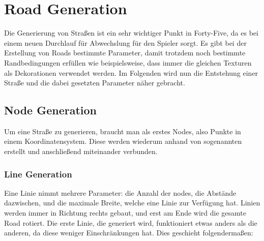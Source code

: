 
\section{Road Generation}\label{sec:road-generation}

\renewcommand{\kapitelautor}{Autor: Felix Zwickelstorfer}

Die Generierung von Straßen ist ein sehr wichtiger Punkt in Forty-Five, da es bei einem neuen Durchlauf für Abwechslung für den Spieler sorgt.
Es gibt bei der Erstellung von Roads bestimmte Parameter, damit trotzdem noch bestimmte Randbedingungen erfüllen wie beispielsweise, dass immer die gleichen Texturen als Dekorationen verwendet werden.
Im Folgenden wird nun die Entstehung einer Straße und die dabei gesetzten Parameter näher gebracht.

\subsection{Node Generation}\label{subsec:node-generation}
Um eine Straße zu generieren, braucht man als erstes Nodes, also Punkte in einem Koordinatensystem.
Diese werden wiederum anhand von sogenannten  erstellt und anschließend miteinander verbunden.

\subsubsection{Line Generation}\label{subsubsec:line-generation}
Eine Linie nimmt mehrere Parameter: die Anzahl der nodes, die Abstände dazwischen, und die maximale Breite, welche eine Linie zur Verfügung hat.
Linien werden immer in Richtung rechts gebaut, und erst am Ende wird die gesamte Road rotiert.
Die erste Linie, die generiert wird, funktioniert etwas anders als die anderen, da diese weniger Einschränkungen hat.
Dies geschieht folgendermaßen:

